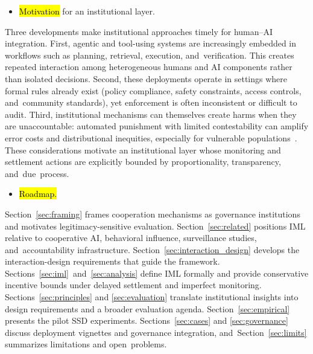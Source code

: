 \documentclass[mca,article,accept,pdftex,oneauthor]{Definitions/mdpi}
\begin{document}
\begin{itemize}[leftmargin=-0.5pt, label={}]
\item {\hl{Motivation} %
 for an institutional layer.}
\end{itemize}

Three developments make institutional approaches timely for human--AI integration. First, agentic and tool-using systems are increasingly embedded in workflows such as planning, retrieval, execution, and~verification. This creates repeated interaction among heterogeneous humans and AI components rather than isolated decisions. Second, these deployments operate in settings where formal rules already exist (policy compliance, safety constraints, access controls, and~community standards), yet enforcement is often inconsistent or difficult to audit. Third, institutional mechanisms can themselves create harms when they are unaccountable: automated punishment with limited contestability can amplify error costs and distributional inequities, especially for vulnerable \mbox{populations \citep{ONeil2016WMD,Eubanks2018AutomatingInequality}.} These considerations motivate an institutional layer whose monitoring and settlement actions are explicitly bounded by proportionality, transparency, and~due~process.


\begin{itemize}[leftmargin=-0.5pt, label={}]
\item {\hl{Roadmap.}}
\end{itemize}

Section~\ref{sec:framing} frames cooperation mechanisms as governance institutions and motivates legitimacy-sensitive evaluation. Section~\ref{sec:related} positions IML relative to cooperative AI, behavioral influence, surveillance studies, and~accountability infrastructure. Section~\ref{sec:interaction_design} develops the interaction-design requirements that guide the framework. \mbox{Sections~\ref{sec:iml} and \ref{sec:analysis}} define IML formally and provide conservative incentive bounds under delayed settlement and imperfect monitoring. Sections~\ref{sec:principles} and \ref{sec:evaluation} translate institutional insights into design requirements and a broader evaluation agenda. Section~\ref{sec:empirical} presents the pilot SSD experiments. Sections~\ref{sec:cases} and \ref{sec:governance} discuss deployment vignettes and governance integration, and~Section~\ref{sec:limits} summarizes limitations and open~problems.
\end{document}
